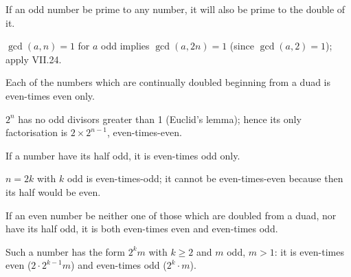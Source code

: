 \begin{claim}
\label{prop:IX.31}
If an odd number be prime to any number, it will also be prime to
the double of it.
\end{claim}
\begin{evidence}[Proof of IX.31]
\label{ev:IX.31}
$\gcd(a, n) = 1$ for $a$ odd implies $\gcd(a, 2n) = 1$ (since
$\gcd(a, 2) = 1$); apply VII.24.
\end{evidence}

\begin{claim}
\label{prop:IX.32}
Each of the numbers which are continually doubled beginning from a
duad is even-times even only.
\end{claim}
\begin{evidence}[Proof of IX.32]
\label{ev:IX.32}
$2^n$ has no odd divisors greater than 1 (Euclid's lemma); hence its
only factorisation is $2 \times 2^{n-1}$, even-times-even.
\end{evidence}

\begin{claim}
\label{prop:IX.33}
If a number have its half odd, it is even-times odd only.
\end{claim}
\begin{evidence}[Proof of IX.33]
\label{ev:IX.33}
$n = 2k$ with $k$ odd is even-times-odd; it cannot be even-times-even
because then its half would be even.
\end{evidence}

\begin{claim}
\label{prop:IX.34}
If an even number be neither one of those which are doubled from a
duad, nor have its half odd, it is both even-times even and
even-times odd.
\end{claim}
\begin{evidence}[Proof of IX.34]
\label{ev:IX.34}
Such a number has the form $2^k m$ with $k \ge 2$ and $m$ odd, $m
> 1$: it is even-times even ($2 \cdot 2^{k-1} m$) and even-times odd
($2^k \cdot m$).
\end{evidence}

